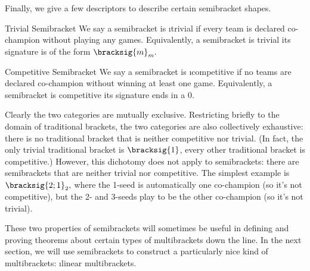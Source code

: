 {    

    Finally, we give a few descriptors to describe certain semibracket shapes.

    \begin{definition}{Trivial Semibracket}{}
        We say a semibracket is \i{trivial} if every team is declared co-champion without playing any games. Equivalently, a semibracket is trivial its signature is of the form $\bracksig{m}_m.$
    \end{definition}

    \begin{definition}{Competitive Semibracket}{}
        We say a semibracket is \i{competitive} if no teams are declared co-champion without winning at least one game. Equivalently, a semibracket is competitive its signature ends in a $0.$
    \end{definition}

    Clearly the two categories are mutually exclusive. Restricting briefly to the domain of traditional brackets, the two categories are also collectively exhaustive: there is no traditional bracket that is neither competitive nor trivial. (In fact, the only trivial traditional bracket is $\bracksig{1}$, every other traditional bracket is competitive.) However, this dichotomy does not apply to semibrackets: there are semibrackets that are neither trivial nor competitive. The simplest example is $\bracksig{2;1}_2,$ where the 1-seed is automatically one co-champion (so it's not competitive), but the 2- and 3-seeds play to be the other co-champion (so it's not trivial).


    These two properties of semibrackets will sometimes be useful in defining and proving theorems about certain types of multibrackets down the line. In the next section, we will use semibrackets to construct a particularly nice kind of multibrackets: \i{linear multibrackets.}
}